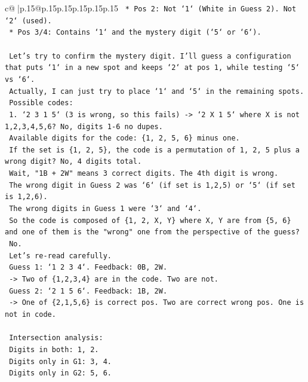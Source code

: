 \documentclass{article}
\begin{document}
{\begin{supertabular}{c@{$\;$}|p{.15\linewidth}@{}p{.15\linewidth}p{.15\linewidth}p{.15\linewidth}p{.15\linewidth}p{.15\linewidth}}
{{{\texttt{        *   Pos 2: Not `1` (White in Guess 2). Not `2` (used).} \\
\texttt{        *   Pos 3/4: Contains `1` and the mystery digit (`5` or `6`).} \\
\\ 
\texttt{    Let's try to confirm the mystery digit. I'll guess a configuration that puts `1` in a new spot and keeps `2` at pos 1, while testing `5` vs `6`.} \\
\texttt{    Actually, I can just try to place `1` and `5` in the remaining spots.} \\
\texttt{    Possible codes:} \\
\texttt{    1. `2 3 1 5` (3 is wrong, so this fails) {-}> `2 X 1 5` where X is not 1,2,3,4,5,6? No, digits 1{-}6 no dupes.} \\
\texttt{    Available digits for the code: \{1, 2, 5, 6\} minus one.} \\
\texttt{    If the set is \{1, 2, 5\}, the code is a permutation of 1, 2, 5 plus a wrong digit? No, 4 digits total.} \\
\texttt{    Wait, "1B + 2W" means 3 correct digits. The 4th digit is wrong.} \\
\texttt{    The wrong digit in Guess 2 was `6` (if set is 1,2,5) or `5` (if set is 1,2,6).} \\
\texttt{    The wrong digits in Guess 1 were `3` and `4`.} \\
\texttt{    So the code is composed of \{1, 2, X, Y\} where X, Y are from \{5, 6\} and one of them is the "wrong" one from the perspective of the guess?} \\
\texttt{    No.} \\
\texttt{    Let's re{-}read carefully.} \\
\texttt{    Guess 1: `1 2 3 4`. Feedback: 0B, 2W.} \\
\texttt{    {-}> Two of \{1,2,3,4\} are in the code. Two are not.} \\
\texttt{    Guess 2: `2 1 5 6`. Feedback: 1B, 2W.} \\
\texttt{    {-}> One of \{2,1,5,6\} is correct pos. Two are correct wrong pos. One is not in code.} \\
\\ 
\texttt{    Intersection analysis:} \\
\texttt{    Digits in both: 1, 2.} \\
\texttt{    Digits only in G1: 3, 4.} \\
\texttt{    Digits only in G2: 5, 6.} \\
}}}
\end{supertabular}}
\end{document}
